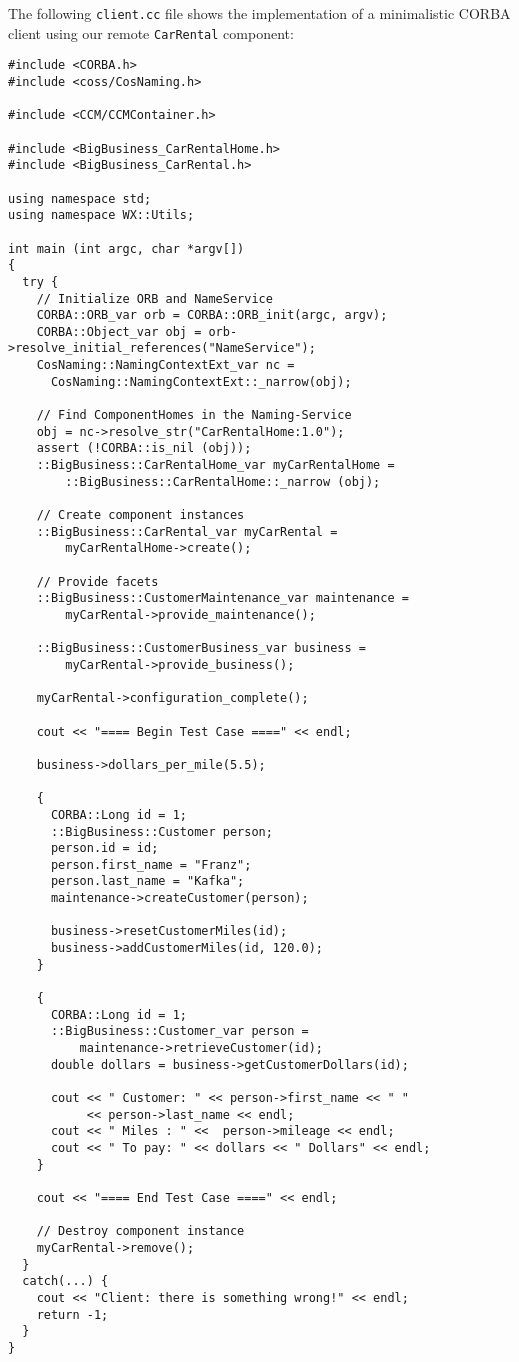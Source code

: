 The following {\tt client.cc} file shows the implementation of a minimalistic
CORBA client using our remote {\tt CarRental} component:
\begin{small}
\begin{verbatim}
#include <CORBA.h>
#include <coss/CosNaming.h>

#include <CCM/CCMContainer.h>

#include <BigBusiness_CarRentalHome.h>
#include <BigBusiness_CarRental.h>

using namespace std;
using namespace WX::Utils;

int main (int argc, char *argv[])
{
  try {
    // Initialize ORB and NameService
    CORBA::ORB_var orb = CORBA::ORB_init(argc, argv);
    CORBA::Object_var obj = orb->resolve_initial_references("NameService");
    CosNaming::NamingContextExt_var nc =
      CosNaming::NamingContextExt::_narrow(obj);
    
    // Find ComponentHomes in the Naming-Service
    obj = nc->resolve_str("CarRentalHome:1.0");
    assert (!CORBA::is_nil (obj));
    ::BigBusiness::CarRentalHome_var myCarRentalHome = 
        ::BigBusiness::CarRentalHome::_narrow (obj);
    
    // Create component instances
    ::BigBusiness::CarRental_var myCarRental = 
        myCarRentalHome->create();
    
    // Provide facets   
    ::BigBusiness::CustomerMaintenance_var maintenance = 
        myCarRental->provide_maintenance();
    
    ::BigBusiness::CustomerBusiness_var business = 
        myCarRental->provide_business();
    
    myCarRental->configuration_complete();
    
    cout << "==== Begin Test Case ====" << endl;
    
    business->dollars_per_mile(5.5);

    {
      CORBA::Long id = 1;
      ::BigBusiness::Customer person;
      person.id = id;
      person.first_name = "Franz";
      person.last_name = "Kafka";
      maintenance->createCustomer(person);
    
      business->resetCustomerMiles(id);
      business->addCustomerMiles(id, 120.0);
    }

    {
      CORBA::Long id = 1;
      ::BigBusiness::Customer_var person = 
          maintenance->retrieveCustomer(id);
      double dollars = business->getCustomerDollars(id); 

      cout << " Customer: " << person->first_name << " " 
           << person->last_name << endl;
      cout << " Miles : " <<  person->mileage << endl;
      cout << " To pay: " << dollars << " Dollars" << endl;
    }

    cout << "==== End Test Case ====" << endl; 

    // Destroy component instance
    myCarRental->remove();
  }
  catch(...) {
    cout << "Client: there is something wrong!" << endl;
    return -1;
  }
}
\end{verbatim}
\end{small}

